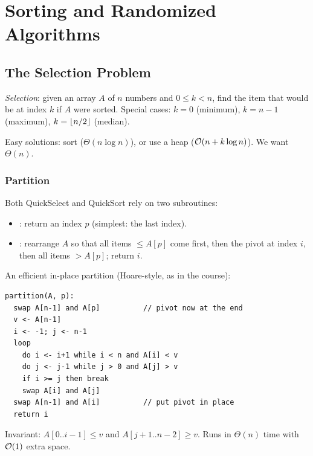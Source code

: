 \chapter{Sorting and Randomized Algorithms}

\section{The Selection Problem}

\begin{definition}
\emph{Selection}: given an array $A$ of $n$ numbers and $0 \le k < n$, find the
item that would be at index $k$ if $A$ were sorted. Special cases: $k = 0$
(minimum), $k = n-1$ (maximum), $k = \left\lfloor n/2 \right\rfloor$ (median).
\end{definition}

Easy solutions: sort ($\Theta(n \log n)$), or use a heap ($\mathcal{O}(n + k\log n)$).
We want $\Theta(n)$.

\subsection{Partition}

Both QuickSelect and QuickSort rely on two subroutines:
\begin{itemize}
  \item {}: return an index $p$ (simplest: the last index).
  \item {}: rearrange $A$ so that all items $\le A[p]$ come
        first, then the pivot at index $i$, then all items $> A[p]$; return $i$.
\end{itemize}

An efficient in-place partition (Hoare-style, as in the course):
\begin{lstlisting}
partition(A, p):
  swap A[n-1] and A[p]          // pivot now at the end
  v <- A[n-1]
  i <- -1; j <- n-1
  loop
    do i <- i+1 while i < n and A[i] < v
    do j <- j-1 while j > 0 and A[j] > v
    if i >= j then break
    swap A[i] and A[j]
  swap A[n-1] and A[i]          // put pivot in place
  return i
\end{lstlisting}
Invariant: $A[0..i-1] \le v$ and $A[j+1..n-2] \ge v$. Runs in $\Theta(n)$ time
with $\mathcal{O}(1)$ extra space.

